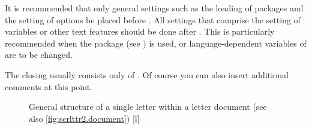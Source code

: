 It is recommended that only general settings such as the loading of packages
and the setting of options be placed before
. All settings that comprise the setting of
variables or other text features should be done after
. This is particularly recommended when the
 package (see \cite{package:babel}) is
used, or language-dependent variables of  are to be changed.

The closing usually consists only of
. Of course you can also insert
additional comments at this point.

\begin{figure}
  \setcapindent{0pt}%
  \begin{captionbeside}{%
      General structure of a single letter within a letter document (see also
      \autoref{fig:scrlttr2.document})%
      \label{fig:scrlttr2.letter}}[l]
    \begin{minipage}[b]{.667\linewidth}%
      \centering\small\setlength{\fboxsep}{1.5ex}%
      \addtolength{\linewidth}{-\dimexpr2\fboxrule+2\fboxsep\relax}%
      \\[1pt]
      \\[1pt]
      \\[\dimexpr\fboxsep+\fboxrule\relax]
    \end{minipage}
  \end{captionbeside}
\end{figure}

